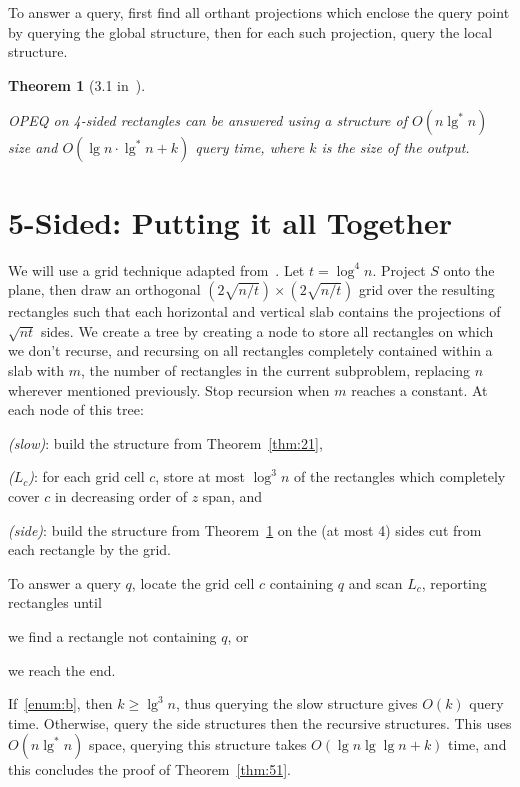\documentclass[letterpaper,12pt,twocolumn]{article}
\newcommand{\BigOh}[1]{O\!\left(#1\right)}
\theoremstyle{plain}
\newtheorem{theorem}{Theorem}
\begin{document}
To answer a query, first find all orthant projections which enclose
the query point by querying the global structure, then for each such
projection, query the local structure.

\begin{theorem}[3.1 in~\cite{saladi2015improved}]\label{thm:31}

  OPEQ on 4-sided rectangles can be answered using a structure of
  $\BigOh{n\lg^* n}$ size and $\BigOh{\lg n \cdot \lg^* n + k}$
  query time, where $k$ is the size of the output.

\end{theorem}

\section{5-Sided: Putting it all Together}

We will use a grid technique adapted from~\cite{alstrup2000new}.  Let
$t = \log^4 n$.  Project $S$ onto the plane, then draw an orthogonal
$(2\sqrt{n/t})\times(2\sqrt{n/t})$ grid over the resulting rectangles
such that each horizontal and vertical slab contains the projections
of $\sqrt{nt}$ sides.  We create a tree by creating a node to store
all rectangles on which we don't recurse, and recursing on all
rectangles completely contained within a slab with $m$, the number of
rectangles in the current subproblem, replacing $n$ wherever mentioned
previously.  Stop recursion when $m$ reaches a constant.  At each node
of this tree:
%
\begin{enumerate*}[label=(\roman*)] %
\item \emph{(slow)}: build the structure from Theorem~\ref{thm:21},
\item \emph{($L_c$)}: for each grid cell $c$, store at most $\log^3 n$
  of the rectangles which completely cover $c$ in decreasing order of
  $z$ span, and
\item \emph{(side)}: build the structure from Theorem~\ref{thm:31} on
  the (at most 4) sides cut from each rectangle by the grid.
\end{enumerate*}

To answer a query $q$, locate the grid cell $c$ containing $q$ and
scan $L_c$, reporting rectangles until
%
\begin{enumerate*}[label=(\alph*)] %
\item\label{enum:a} we find a rectangle not containing $q$, or
\item\label{enum:b} we reach the end.
\end{enumerate*}

If~\ref{enum:b}, then $k \ge \lg^3 n$, thus querying the slow
structure gives $\BigOh{k}$ query time.  Otherwise, query the side
structures then the recursive structures.  This uses $\BigOh{n\lg^*
  n}$ space, querying this structure takes $\BigOh{\lg n\lg\lg n + k}$
time, and this concludes the proof of Theorem~\ref{thm:51}.



\end{document}
